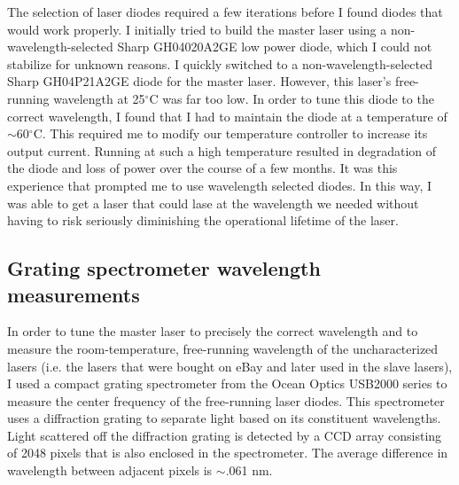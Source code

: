 
The selection of laser diodes required a few iterations before I found diodes that would work properly. I initially tried to build the master laser using a non-wavelength-selected Sharp GH04020A2GE low power diode, which I could not stabilize for unknown reasons. I quickly switched to a non-wavelength-selected Sharp GH04P21A2GE diode for the master laser. However, this laser's free-running wavelength at 25$^\circ$C was far too low. In order to tune this diode to the correct wavelength, I found that I had to maintain the diode at a temperature of $\sim$60$^\circ$C. This required me to modify our temperature controller to increase its output current. Running at such a high temperature resulted in degradation of the diode and loss of power over the course of a few months. It was this experience that prompted me to use wavelength selected diodes. In this way, I was able to get a laser that could lase at the wavelength we needed without having to risk seriously diminishing the operational lifetime of the laser.


\subsection{Grating spectrometer wavelength measurements}
\label{gratingSpectrometerWavelengthMeasurements}
In order to tune the master laser to precisely the correct wavelength and to measure the room-temperature, free-running wavelength of the uncharacterized lasers (i.e. the lasers that were bought on eBay and later used in the slave lasers), I used a compact grating spectrometer from the Ocean Optics USB2000 series to measure the center frequency of the free-running laser diodes. This spectrometer uses a diffraction grating to separate light based on its constituent wavelengths. Light scattered off the diffraction grating is detected by a CCD array consisting of 2048 pixels that is also enclosed in the spectrometer. The average difference in wavelength between adjacent pixels is $\sim$.061 nm. %

